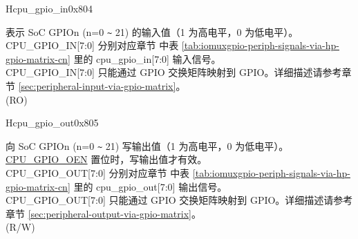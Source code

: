 \begin{register}{H}{cpu\_gpio\_in}{0x804}\label{regdesc:GPIO_IN}
%
%
%
%
%
%
%
%
%
\regnewline%
\begin{regdesc}\begin{reglist}
\label{fielddesc:GPIO_IN}\item [CPU\_GPIO\_IN] 表示 SoC GPIOn (n=0 \verb+~+ 21) 的输入值（1 为高电平，0 为低电平）。\\
CPU\_GPIO\_IN[7:0] 分别对应章节 \textit{} 中表 \ref{tab:iomuxgpio-periph-signals-via-hp-gpio-matrix-cn} 里的 cpu\_gpio\_in[7:0] 输入信号。\\
CPU\_GPIO\_IN[7:0] 只能通过 GPIO 交换矩阵映射到 GPIO。详细描述请参考章节 \ref{sec:peripheral-input-via-gpio-matrix}。
\\
(RO)
\end{reglist}\end{regdesc}
\end{register}
\begin{register}{H}{cpu\_gpio\_out}{0x805}\label{regdesc:GPIO_OUT}
%
%
%
%
%
%
%
%
%
\regnewline%
\begin{regdesc}\begin{reglist}
\label{fielddesc:GPIO_OUT}\item [CPU\_GPIO\_OUT] 向 SoC GPIOn (n=0 \verb+~+ 21) 写输出值（1 为高电平，0 为低电平）。\hyperref[fielddesc:GPIO_OEN]{CPU\_GPIO\_OEN} 置位时，写输出值才有效。\\
CPU\_GPIO\_OUT[7:0] 分别对应章节 \textit{} 中表 \ref{tab:iomuxgpio-periph-signals-via-hp-gpio-matrix-cn} 里的 cpu\_gpio\_out[7:0] 输出信号。\\
CPU\_GPIO\_OUT[7:0] 只能通过 GPIO 交换矩阵映射到 GPIO。详细描述请参考章节 \ref{sec:peripheral-output-via-gpio-matrix}。
\\
(R/W)
\end{reglist}\end{regdesc}
\end{register}
